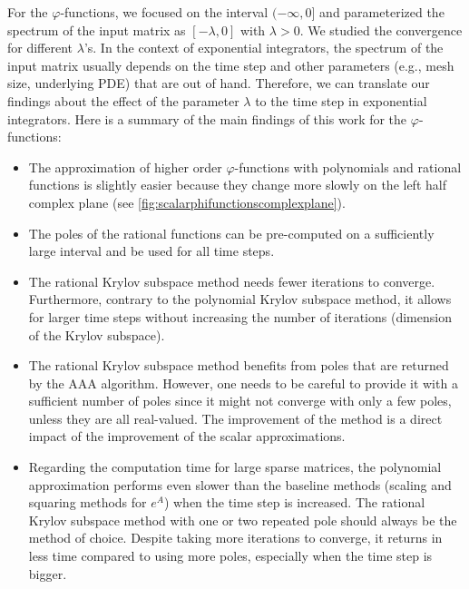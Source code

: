 For the $\varphi$-functions, we focused on the interval $(-\infty, 0]$ and parameterized
the spectrum of the input matrix as $[-\lambda, 0]$ with $\lambda > 0$. We studied the
convergence for different $\lambda$'s.
In the context of exponential integrators, the spectrum of the input matrix usually
depends on the time step and other parameters (e.g., mesh size, underlying PDE)
that are out of hand.
Therefore, we can translate our findings about the effect of the parameter $\lambda$ to
the time step in exponential integrators.
Here is a summary of the main findings of this work for the $\varphi$-functions:
\begin{itemize}
    \item The approximation of higher order $\varphi$-functions with polynomials
        and rational functions is slightly easier because they change more slowly
        on the left half complex plane (see \autoref{fig:scalarphifunctionscomplexplane}).
    \item The poles of the rational functions can be pre-computed on a sufficiently
        large interval and be used for all time steps.
    \item The rational Krylov subspace method needs fewer iterations to converge.
        Furthermore, contrary to the polynomial Krylov subspace method, it allows for
        larger time steps without increasing the number of iterations
        (dimension of the Krylov subspace).
    \item The rational Krylov subspace method benefits from poles that are returned by
        the AAA algorithm.
        However, one needs to be careful to provide it with a sufficient number of poles
        since it might not converge with only a few poles, unless they are all real-valued.
        The improvement of the method is a direct impact of the improvement of the scalar
        approximations.
    \item Regarding the computation time for large sparse matrices, the polynomial
        approximation performs even slower than the baseline methods
        (scaling and squaring methods for $e^A$) when the time step is increased.
        The rational Krylov subspace method with one or two repeated pole should always
        be the method of choice. Despite taking more iterations to converge, it returns
        in less time compared to using more poles, especially when the time step is bigger.
\end{itemize}

